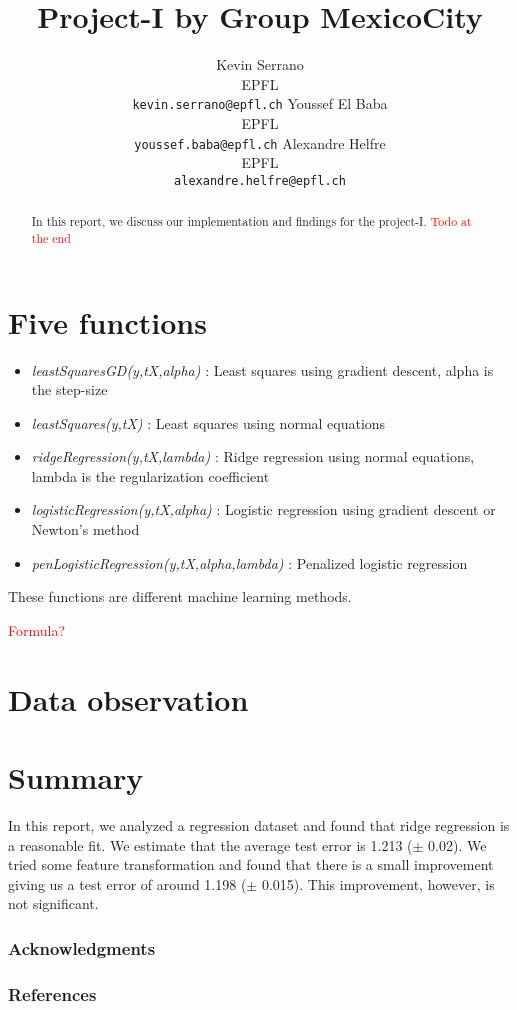 \documentclass{article} %
\title{Project-I by Group MexicoCity}
\author{
Kevin Serrano\\EPFL\\
\texttt{kevin.serrano@epfl.ch} \And Youssef El Baba\\EPFL\\
\texttt{youssef.baba@epfl.ch} \And Alexandre Helfre\\EPFL\\
\texttt{alexandre.helfre@epfl.ch}
}
\begin{document}
\maketitle

\begin{abstract}
In this report, we discuss our implementation and findings for the project-I. \textcolor{red}{Todo at the end}


\end{abstract}
\section{Five functions}
\begin{itemize}
\item \textit{leastSquaresGD(y,tX,alpha)} : Least squares using gradient descent, alpha is the step-size
\item \textit{leastSquares(y,tX)} : Least squares using normal equations
\item \textit{ridgeRegression(y,tX,lambda)} : Ridge regression using normal equations, lambda is the regularization coefficient
\item \textit{logisticRegression(y,tX,alpha)} : Logistic regression using gradient descent or Newton's method
\item \textit{penLogisticRegression(y,tX,alpha,lambda)} : Penalized logistic regression 

\end{itemize}
These functions are different machine learning methods.

\textcolor{red}{Formula?}

\section{Data observation}



\section{Summary}
In this report, we analyzed a regression dataset and found that ridge regression is a reasonable fit. We estimate that the average test error is 1.213 ($\pm$ 0.02). We tried some feature transformation and found that there is a small improvement giving us a test error of around 1.198 ($\pm$ 0.015). This improvement, however, is not significant.


\subsubsection*{Acknowledgments}


\subsubsection*{References}
\end{document}
